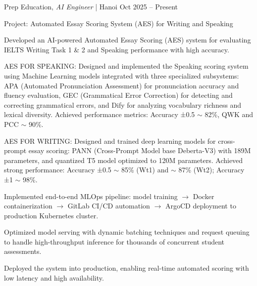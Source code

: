 
\begin{cventries2}

  \cventrynew
  {Prep Education, \textnormal{\textit{AI Engineer} | Hanoi}}
  {Oct 2025 -- Present}
  {}

\end{cventries2}

\vspace{-10pt}

\begin{cventries}

  \cventry
    {Project: Automated Essay Scoring System (AES) for Writing and Speaking}
    {}
    {
      \begin{cvitems}
        \item {Developed an AI-powered Automated Essay Scoring (AES) system for evaluating IELTS Writing Task 1 \& 2 and Speaking performance with high accuracy.}
        \item {AES FOR SPEAKING: Designed and implemented the Speaking scoring system using Machine Learning models integrated with three specialized subsystems: APA (Automated Pronunciation Assessment) for pronunciation accuracy and fluency evaluation, GEC (Grammatical Error Correction) for detecting and correcting grammatical errors, and Dify for analyzing vocabulary richness and lexical diversity. Achieved performance metrics: Accuracy ±0.5 $\sim$ 82\%, QWK and PCC $\sim$ 90\%.}
        \item {AES FOR WRITING: Designed and trained deep learning models for cross-prompt essay scoring: PANN (Cross-Prompt Model base Deberta-V3) with 189M parameters, and quantized T5 model optimized to 120M parameters. Achieved strong performance: Accuracy ±0.5 $\sim$ 85\% (Wt1) and $\sim$ 87\% (Wt2); Accuracy ±1 $\sim$ 98\%.}
        \item {Implemented end-to-end MLOps pipeline: model training $\rightarrow$ Docker containerization $\rightarrow$ GitLab CI/CD automation $\rightarrow$ ArgoCD deployment to production Kubernetes cluster.}
        \item {Optimized model serving with dynamic batching techniques and request queuing to handle high-throughput inference for thousands of concurrent student assessments.}
        \item {Deployed the system into production, enabling real-time automated scoring with low latency and high availability.}
      \end{cvitems}
    }


\end{cventries}
